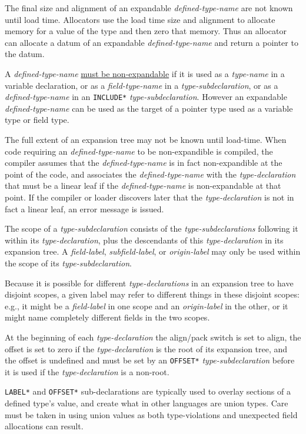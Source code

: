 \documentclass[12pt]{article}
\begin{document}
The final size and alignment of an expandable {\em defined-type-name}
are not known until load time.
Allocators use the load time
size and alignment to allocate memory for a value of
the type and then zero that memory.  Thus an allocator
can allocate a datum of an expandable {\em defined-type-name}
and return a pointer to the datum.

A {\em defined-type-name} \underline{must be non-expandable} if it is used as
a {\em type-name} in a variable declaration, or as a {\em field-type-name}
in a {\em type-subdeclaration}, or as a {\em defined-type-name} in an
{\tt *INCLUDE*} {\em type-subdeclaration}.  However an expandable
{\em defined-type-name}
can be used as the target of a pointer type used as a variable type or
field type.

The full extent of an expansion tree may not be known until load-time.
When code requiring an {\em defined-type-name} to be non-expandible is
compiled, the compiler assumes that the {\em defined-type-name} is in fact
non-expandible at the point of the code,
and associates the {\em defined-type-name} with the
{\em type-declaration} that must be a linear leaf if the {\em defined-type-name}
is non-expandable at that point.
If the compiler or loader discovers later that the
{\em type-declaration} is not in fact a linear leaf, an error message
is issued.

The scope of a {\em type-subdeclaration} consists of
the {\em type-subdeclarations} following it within its
{\em type-declaration}, plus the descendants
of this {\em type-declaration} in its expansion tree.
A {\em field-label}, {\em subfield-label}, or {\em origin-label} may
only be used within the scope of its {\em type-subdeclaration}.

Because it is possible for different {\em type-declarations} in
an expansion tree to have disjoint scopes, a given label may refer
to different things in these disjoint scopes: e.g., it might be a
{\em field-label} in one scope and an {\em origin-label} in the
other, or it might name completely different fields in the two scopes.

At the beginning of each {\em type-declaration} the align/pack switch
is set to align, the offset is set to zero if the {\em type-declaration}
is the root of its expansion tree, and the offset is undefined and
must be set by an {\tt *OFFSET*} {\em type-subdeclaration} before
it is used if the {\em type-declaration} is a non-root.

{\tt *LABEL*} and {\tt *OFFSET*} sub-declarations are typically used
to overlay sections of a defined type's value, and create what in other
languages are union types.  Care must be taken in using union values
as both type-violations and unexpected field allocations can result.
\end{document}
